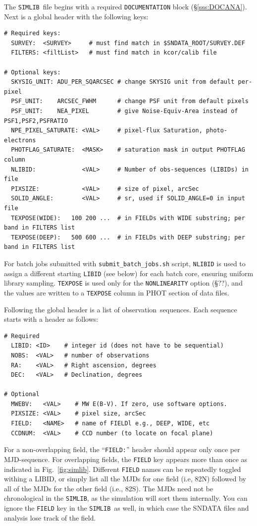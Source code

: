 \documentclass[12pt]{article}
\newcommand{\simlib}{{\tt SIMLIB}}
\newcommand{\obs}{observation}
\newcommand{\submit}{\tt submit\_batch\_jobs.sh}
\begin{document}
{The \simlib\ file begins with a required {\tt DOCUMENTATION} block
(\S\ref{sss:DOCANA}).
Next is a global header with the following keys:
\begin{verbatim}
# Required keys:
  SURVEY:  <SURVEY>     # must find match in $SNDATA_ROOT/SURVEY.DEF
  FILTERS: <filtList>   # must find match in kcor/calib file 

# Optional keys:
  SKYSIG_UNIT: ADU_PER_SQARCSEC # change SKYSIG unit from default per-pixel
  PSF_UNIT:    ARCSEC_FWHM      # change PSF unit from default pixels
  PSF_UNIT:    NEA_PIXEL        # give Noise-Equiv-Area instead of PSF1,PSF2,PSFRATIO
  NPE_PIXEL_SATURATE: <VAL>     # pixel-flux Saturation, photo-electrons
  PHOTFLAG_SATURATE:  <MASK>    # saturation mask in output PHOTFLAG column
  NLIBID:             <VAL>     # Number of obs-sequences (LIBIDs) in file
  PIXSIZE:            <VAL>     # size of pixel, arcSec
  SOLID_ANGLE:        <VAL>     # sr, used if SOLID_ANGLE=0 in input file
  TEXPOSE(WIDE):   100 200 ...  # in FIELDs with WIDE substring; per band in FILTERS list
  TEXPOSE(DEEP):   500 600 ...  # in FIELDs with DEEP substring; per band in FILTERS list
\end{verbatim} 
%
For batch jobs submitted with {\submit} script,
{\tt NLIBID} is used to assign a different starting {\tt LIBID}
(see below) for each batch core, ensuring uniform library sampling.
{\tt TEXPOSE} is used only for the {\tt NONLINEARITY} option (\S??),
and the values are written to a {\tt TEXPOSE} column in PHOT section
of data files.

\clearpage
Following the global header is a list of \obs\ sequences.
Each sequence starts with a header as follows:
\begin{verbatim}
# Required
  LIBID: <ID>    # integer id (does not have to be sequential)
  NOBS:  <VAL>   # number of observations
  RA:    <VAL>   # Right ascension, degrees
  DEC:   <VAL>   # Declination, degrees

# Optional
  MWEBV:   <VAL>    # MW E(B-V). If zero, use software options.
  PIXSIZE: <VAL>    # pixel size, arcSec
  FIELD:   <NAME>   # name of FIELDl e.g., DEEP, WIDE, etc
  CCDNUM:  <VAL>    # CCD number (to locate on focal plane)
\end{verbatim}
%
For a non-overlapping field, the ``{\tt FIELD:}'' header should appear
only once per MJD-sequence. For overlapping fields, 
the {\tt FIELD} key appears more than once as indicated
in Fig.~\ref{fig:simlib}.  
Different {\tt FIELD} names can be repeatedly toggled withing a LIBID,
or simply list all the MJDs for one field (i.e, 82N) followed by all 
of the MJDs for the other field (i.e., 82S).
The MJDs need not be chronological in the \simlib, as the simulation
will sort them internally. You can ignore the {\tt FIELD} key in the
\simlib\ as well, in which case the SNDATA files and analysis lose
track of the field.


}
\end{document}
